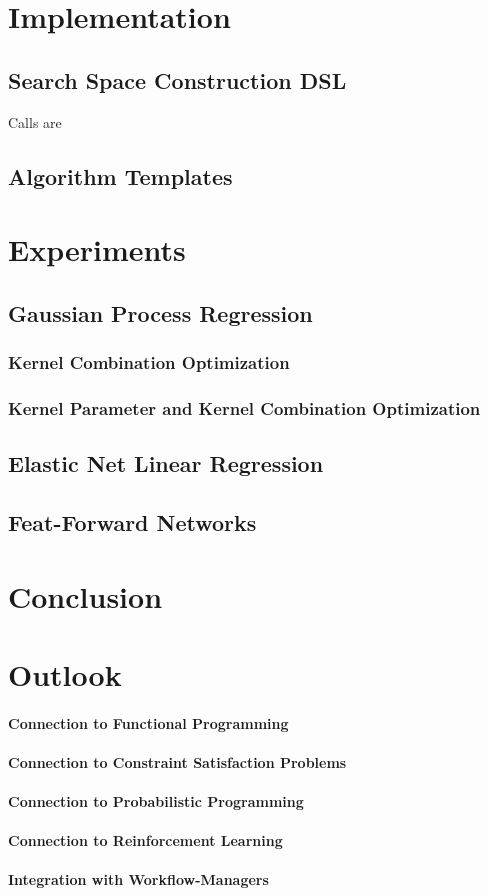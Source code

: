 \documentclass[english]{article}
\begin{document}
\section{Implementation}
\subsection{Search Space Construction DSL}
Calls are 
\subsection{Algorithm Templates}


\section{Experiments}
\subsection{Gaussian Process Regression}
\subsubsection{Kernel Combination Optimization}
\subsubsection{Kernel Parameter and Kernel Combination Optimization}
\subsection{Elastic Net Linear Regression}
\subsection{Feat-Forward Networks}

\section{Conclusion}

\section{Outlook}
\paragraph{Connection to Functional Programming}
\paragraph{Connection to Constraint Satisfaction Problems}
\paragraph{Connection to Probabilistic Programming}
\paragraph{Connection to Reinforcement Learning}
\paragraph{Integration with Workflow-Managers}
\paragraph{}

\printbibliography
\end{document}
